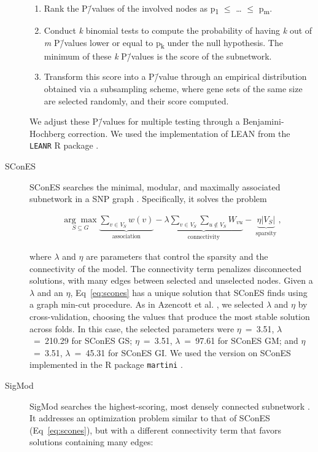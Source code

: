 \documentclass[10pt,letterpaper]{article}
\begin{document}
\begin{description}
\begin{enumerate}
\item Rank the P\=/values of the involved nodes as p\textsubscript{1} \(\le\) \dots{} \(\le\) p\textsubscript{m}. 
\item Conduct \emph{k} binomial tests to compute the probability of having \emph{k} out of \emph{m} P\=/values lower or equal to p\textsubscript{k} under the null hypothesis. The minimum of these \emph{k} P\=/values is the score of the subnetwork.
\item Transform this score into a P\=/value through an empirical distribution obtained via a subsampling scheme, where gene sets of the same size are selected randomly, and their score computed. 
\end{enumerate}

We adjust these P\=/values for multiple testing through a Benjamini-Hochberg correction. We used the implementation of LEAN from the \texttt{LEANR} R package \cite{leanr}.

\item[{SConES}] SConES searches the minimal, modular, and maximally associated subnetwork in a SNP graph \cite{azencott_efficient_2013}. Specifically, it solves the problem

\begin{eqnarray}
\label{eq:scones}
\underset{S \subseteq G}{\arg \max } \underbrace{\sum_{v \in V_S} w(v)}_{\text { association }} - \underbrace{\lambda \sum_{v \in V_S} \sum_{u \not\in V_S} {W}_{vu} }_{\text { connectivity }}-\underbrace{\eta \lvert V_S \rvert }_{\text { sparsity }},
\end{eqnarray}

where \(\lambda\) and \(\eta\) are parameters that control the sparsity and the connectivity of the model. The connectivity term penalizes disconnected solutions, with many edges between selected and unselected nodes. Given a $\lambda$ and an $\eta$, Eq~\ref{eq:scones} has a unique solution that SConES finds using a graph min-cut procedure. As in Azencott et al. \cite{azencott_efficient_2013}, we selected \(\lambda\) and \(\eta\) by cross-validation, choosing the values that produce the most stable solution across folds. In this case, the selected parameters were \(\eta\)~=~3.51, \(\lambda\)~=~210.29 for SConES GS; \(\eta\)~=~3.51, \(\lambda\)~=~97.61 for SConES GM; and \(\eta\)~=~3.51, \(\lambda\)~=~45.31 for SConES GI. We used the version on SConES implemented in the R package \texttt{martini} \cite{martini}.

\item[{SigMod}] SigMod searches the highest-scoring, most densely connected subnetwork \cite{liu_sigmod:_2017}. It addresses an optimization problem similar to that of SConES (Eq~\ref{eq:scones}), but with a different connectivity term that favors solutions containing many edges:  


\end{description}
\end{document}
